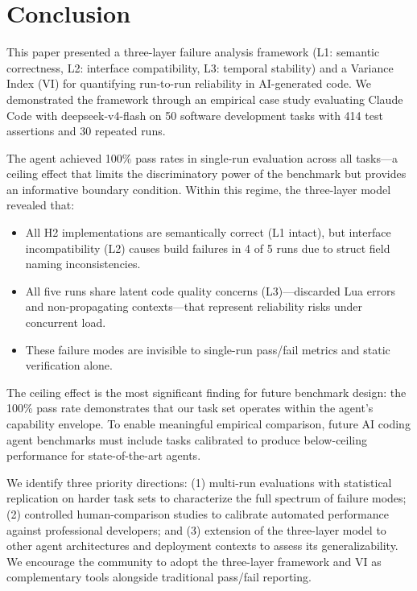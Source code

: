 \documentclass[conference]{IEEEtran}
\begin{document}
\section{Conclusion}
\label{sec:conclusion}

This paper presented a three-layer failure analysis framework (L1: semantic correctness, L2: interface compatibility, L3: temporal stability) and a Variance Index (VI) for quantifying run-to-run reliability in AI-generated code. We demonstrated the framework through an empirical case study evaluating Claude Code with deepseek-v4-flash on 50 software development tasks with 414 test assertions and 30 repeated runs.

The agent achieved 100\% pass rates in single-run evaluation across all tasks---a ceiling effect that limits the discriminatory power of the benchmark but provides an informative boundary condition. Within this regime, the three-layer model revealed that:
\begin{itemize}
        \item All H2 implementations are semantically correct (L1 intact), but interface incompatibility (L2) causes build failures in 4 of 5 runs due to struct field naming inconsistencies.
        \item All five runs share latent code quality concerns (L3)---discarded Lua errors and non-propagating contexts---that represent reliability risks under concurrent load.
        \item These failure modes are invisible to single-run pass/fail metrics and static verification alone.
\end{itemize}

The ceiling effect is the most significant finding for future benchmark design: the 100\% pass rate demonstrates that our task set operates within the agent's capability envelope. To enable meaningful empirical comparison, future AI coding agent benchmarks must include tasks calibrated to produce below-ceiling performance for state-of-the-art agents.

We identify three priority directions: (1) multi-run evaluations with statistical replication on harder task sets to characterize the full spectrum of failure modes; (2) controlled human-comparison studies to calibrate automated performance against professional developers; and (3) extension of the three-layer model to other agent architectures and deployment contexts to assess its generalizability. We encourage the community to adopt the three-layer framework and VI as complementary tools alongside traditional pass/fail reporting.
\end{document}
